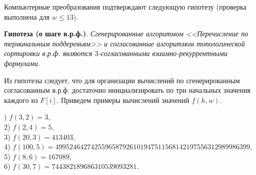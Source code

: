 Компьютерные преобразования подтверждают следующую гипотезу (проверка выполнена для $w\leq 13$).
\par\smallskip
\textbf{ Гипотеза (о шаге в.р.ф.)}. \textit{ Сгенерированные алгоритмом <<Перечисление по терминальным поддеревьям>> и согласованные алгоритмом топологической сортировки в.р.ф. являются $3$-согласованными взаимно-рекуррентными формулами.}
\par\smallskip
Из гипотезы следует, что для организации вычислений по сгенерированным согласованным в.р.ф. достаточно инициализировать по три начальных значения каждого из $F[i]$.  Приведем примеры вычислений значений $f(h,w)$.
\par\smallskip
{\small
{}) $f(3,2)=3$,\\
2) $f(2,4) = 5$,\\
3) $f(20,3)=413403$,\\
4) $f(100,5)=4995246427425596587926101947511568142197556312989986399$, \\
5) $f(8,6)=167089$,\\
6) $f(30,7) = 744382189686310539093281$.
} 